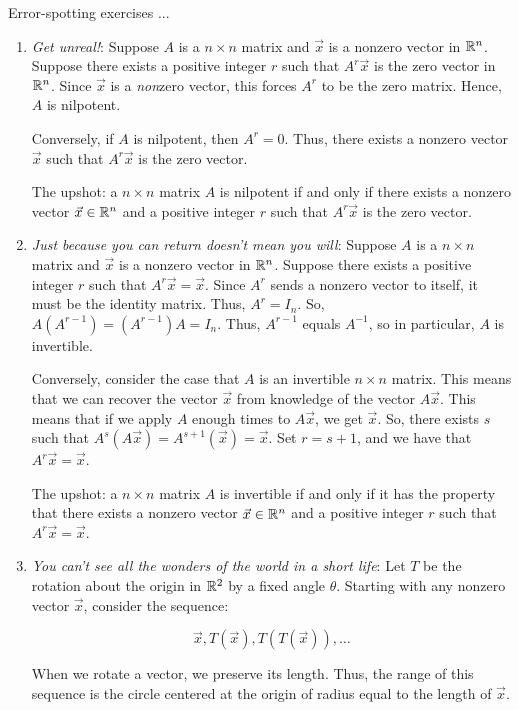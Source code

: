 \documentclass[10pt]{amsart}
\begin{document}
Error-spotting exercises ...

\begin{enumerate}
\item {\em Get unreal!}: Suppose $A$ is a $n \times n$ matrix and
  $\vec{x}$ is a nonzero vector in $\mathbb{R}^n$. Suppose there exists a
  positive integer $r$ such that $A^r\vec{x}$ is the zero vector in
  $\mathbb{R}^n$. Since $\vec{x}$ is a {\em non}zero vector, this forces $A^r$
  to be the zero matrix. Hence, $A$ is nilpotent.

  Conversely, if $A$ is nilpotent, then $A^r = 0$. Thus, there exists
  a nonzero vector $\vec{x}$ such that $A^r\vec{x}$ is the zero
  vector.

  The upshot: a $n \times n$ matrix $A$ is nilpotent if and only if
  there exists a nonzero vector $\vec{x} \in \mathbb{R}^n$ and a positive
  integer $r$ such that $A^r\vec{x}$ is the zero vector.

\item {\em Just because you can return doesn't mean you will}: Suppose
  $A$ is a $n \times n$ matrix and $\vec{x}$ is a nonzero vector in
  $\mathbb{R}^n$. Suppose there exists a positive integer $r$ such that
  $A^r\vec{x} = \vec{x}$. Since $A^r$ sends a nonzero vector to
  itself, it must be the identity matrix. Thus, $A^r = I_n$. So,
  $A(A^{r-1}) = (A^{r-1})A = I_n$. Thus, $A^{r-1}$ equals $A^{-1}$, so
  in particular, $A$ is invertible.

  Conversely, consider the case that $A$ is an invertible $n \times n$
  matrix. This means that we can recover the vector $\vec{x}$ from
  knowledge of the vector $A\vec{x}$. This means that if we apply $A$
  enough times to $A\vec{x}$, we get $\vec{x}$. So, there exists $s$
  such that $A^s(A\vec{x}) = A^{s+1}(\vec{x}) = \vec{x}$. Set $r = s +
  1$, and we have that $A^r\vec{x} = \vec{x}$.

  The upshot: a $n \times n$ matrix $A$ is invertible if and only if
  it has the property that there exists a nonzero vector $\vec{x} \in
  \mathbb{R}^n$ and a positive integer $r$ such that $A^r\vec{x} = \vec{x}$.
\item {\em You can't see all the wonders of the world in a short
  life}: Let $T$ be the rotation about the origin in $\mathbb{R}^2$ by a fixed
  angle $\theta$. Starting with any nonzero vector $\vec{x}$, consider
  the sequence:

  $$\vec{x},T(\vec{x}),T(T(\vec{x})),\dots$$

  When we rotate a vector, we preserve its length. Thus, the range of
  this sequence is the circle centered at the origin of radius equal
  to the length of $\vec{x}$.


\end{enumerate}
\end{document}
